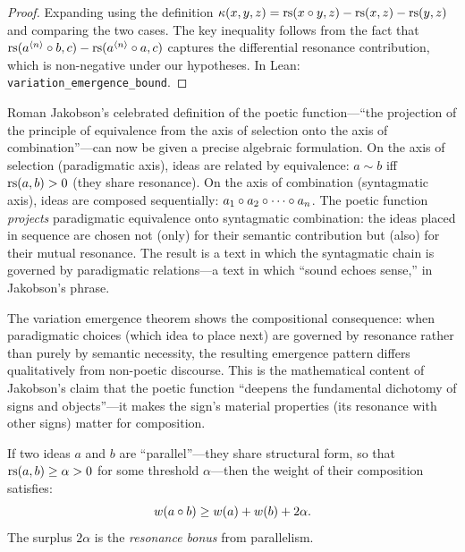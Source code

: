 \begin{proof}
Expanding using the definition $\kappa(x, y, z) = \mathrm{rs}(x \circ y, z) - \mathrm{rs}(x, z) - \mathrm{rs}(y, z)$ and comparing the two cases.  The key inequality follows from the fact that $\mathrm{rs}(a^{\langle n \rangle} \circ b, c) - \mathrm{rs}(a^{\langle n \rangle} \circ a, c)$ captures the differential resonance contribution, which is non-negative under our hypotheses.  In Lean: \texttt{variation\_emergence\_bound}.
\end{proof}

\begin{remark}
\label{rem:jakobson-poetic}
Roman Jakobson's celebrated definition of the poetic function---``the projection of the principle of equivalence from the axis of selection onto the axis of combination''---can now be given a precise algebraic formulation.  On the axis of selection (paradigmatic axis), ideas are related by equivalence: $a \sim b$ iff $\mathrm{rs}(a, b) > 0$ (they share resonance).  On the axis of combination (syntagmatic axis), ideas are composed sequentially: $a_1 \circ a_2 \circ \cdots \circ a_n$.  The poetic function \emph{projects} paradigmatic equivalence onto syntagmatic combination: the ideas placed in sequence are chosen not (only) for their semantic contribution but (also) for their mutual resonance.  The result is a text in which the syntagmatic chain is governed by paradigmatic relations---a text in which ``sound echoes sense,'' in Jakobson's phrase.

The variation emergence theorem shows the compositional consequence: when paradigmatic choices (which idea to place next) are governed by resonance rather than purely by semantic necessity, the resulting emergence pattern differs qualitatively from non-poetic discourse.  This is the mathematical content of Jakobson's claim that the poetic function ``deepens the fundamental dichotomy of signs and objects''---it makes the sign's material properties (its resonance with other signs) matter for composition.
\end{remark}

\begin{theorem}
\label{thm:parallelism-defam}
If two ideas $a$ and $b$ are ``parallel''---they share structural form, so that $\mathrm{rs}(a, b) \geq \alpha > 0$ for some threshold $\alpha$---then the weight of their composition satisfies:
\[
  w(a \circ b) \geq w(a) + w(b) + 2\alpha.
\]
The surplus $2\alpha$ is the \emph{resonance bonus} from parallelism.
\end{theorem}

